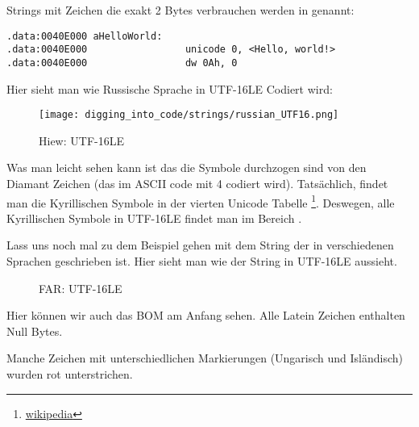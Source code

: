Strings mit Zeichen die exakt 2 Bytes verbrauchen werden  in \IDA genannt:

\begin{lstlisting}[style=customasmx86]
.data:0040E000 aHelloWorld:
.data:0040E000                 unicode 0, <Hello, world!>
.data:0040E000                 dw 0Ah, 0
\end{lstlisting}

Hier sieht man wie Russische Sprache in UTF-16LE Codiert wird:

\begin{figure}[H]
\centering
\texttt{[image: digging\_into\_code/strings/russian\_UTF16.png]}
\caption{Hiew: UTF-16LE}
\end{figure}

Was man leicht sehen kann ist das die Symbole durchzogen sind von den Diamant Zeichen (das im ASCII code mit 4 codiert wird).
Tats\"achlich, findet man die Kyrillischen Symbole in der vierten Unicode Tabelle 
\footnote{\href{http://go.yurichev.com/17003}{wikipedia}}.
Deswegen, alle Kyrillischen Symbole in UTF-16LE findet man im Bereich .

Lass uns noch mal zu dem Beispiel gehen mit dem String der in verschiedenen Sprachen geschrieben ist.
Hier sieht man wie der String in UTF-16LE aussieht. 

\begin{figure}[H]
\centering
{}
\caption{FAR: UTF-16LE}
\end{figure}

Hier k\"onnen wir auch das \ac{BOM} am Anfang sehen. 
Alle Latein Zeichen enthalten Null Bytes.

Manche Zeichen mit unterschiedlichen Markierungen (Ungarisch und Isl\"andisch) wurden rot unterstrichen.



